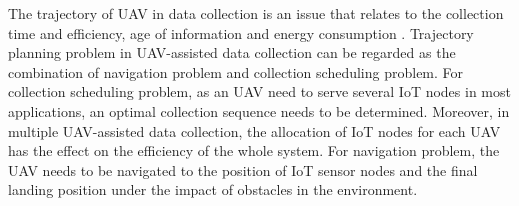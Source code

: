 \documentclass[journal]{IEEEtran}
\begin{document}
The trajectory of UAV in data collection is an issue that relates to the collection time and efficiency, age of information and energy consumption \cite{Cheng23}. Trajectory planning problem in UAV-assisted data collection can be regarded as the combination of navigation problem and collection scheduling problem. For collection scheduling problem, as an UAV need to serve several IoT nodes in most applications, an optimal collection sequence needs to be determined. Moreover, in multiple UAV-assisted data collection, the allocation of IoT nodes for each UAV has the effect on the efficiency of the whole system. For navigation problem, the UAV needs to be navigated to the position of IoT sensor nodes and the final landing position under the impact of obstacles in the environment. 
% 
%  

\end{document}
